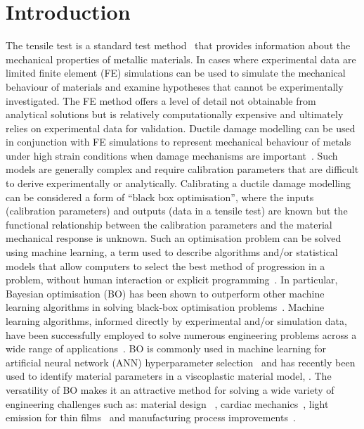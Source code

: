 \documentclass[preprint, review, 12pt]{elsarticle}
\begin{document}
	\section{Introduction}
	\label{h:introduction}

	The tensile test is a standard test method~\cite{ENISO6892} that provides information about the mechanical properties of metallic materials.
	In cases where experimental data are limited finite element (FE) simulations can be used to simulate the mechanical behaviour of materials and examine hypotheses that cannot be experimentally investigated.
	The FE method offers a level of detail not obtainable from analytical solutions but is relatively computationally expensive and ultimately relies on experimental data for validation.
	Ductile damage modelling can be used in conjunction with FE simulations to represent mechanical behaviour of metals under high strain conditions when damage mechanisms are important~\cite{ABBASSI2013, CHAHBOUB2019, ZHANG2021}.
	Such models are generally complex and require calibration parameters that are difficult to derive experimentally or analytically.
	Calibrating a ductile damage modelling can be considered a form of ``black box optimisation'', where the inputs (calibration parameters) and outputs (data in a tensile test) are known but the functional relationship between the calibration parameters and the material mechanical response is unknown.
	Such an optimisation problem can be solved using machine learning, a term used to describe algorithms and/or statistical models that allow computers to select the best method of progression in a problem, without human interaction or explicit programming~\cite{BIKMKHAMETOV2020}.
	In particular, Bayesian optimisation (BO) has been shown to outperform other machine learning algorithms in solving black-box optimisation problems~\cite{SNOEK2012}.
	Machine learning algorithms, informed directly by experimental and/or simulation data, have been successfully employed to solve numerous engineering problems across a wide range of applications~\cite{MONGAN2022, LIU2020, HEGDE2020}.
	BO is commonly used in machine learning for artificial neural network (ANN) hyperparameter selection~\cite{DEWANCKER2016, MONGAN2022, BIKMKHAMETOV2020, GHAVAMIAN2021} and has recently been used to identify material parameters in a viscoplastic material model, \citet{RYAN2022}.
	The versatility of BO makes it an attractive method for solving a wide variety of engineering challenges such as: material design ~\cite{ZHANG2020, CHUAQUI2021}, cardiac mechanics~\cite{BOROWSKA2022}, light emission for thin films~\cite{WANKERL2022} and manufacturing process improvements~\cite{MONGAN2022, GUNN2022}.
\end{document}
